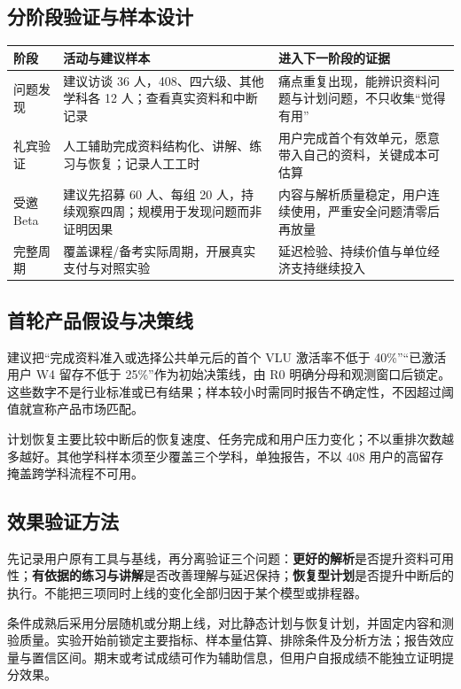 \documentclass[UTF8,a4paper,11pt,fontset=none]{ctexart}
\newcommand{\cth}[1]{\textbf{\sffamily #1}}
\newenvironment{tbl}{\par\vspace{3pt}\small\noindent\ignorespaces}{\unskip\par\vspace{5pt}}
\begin{document}
\subsection{分阶段验证与样本设计}
\begin{tbl}
\begin{tabularx}{\linewidth}{@{}L{25mm}YY@{}}
\toprule
\cth{阶段}&\cth{活动与建议样本}&\cth{进入下一阶段的证据}\\\midrule
问题发现&建议访谈 36 人，408、四六级、其他学科各 12 人；查看真实资料和中断记录&痛点重复出现，能辨识资料问题与计划问题，不只收集“觉得有用”\\
礼宾验证&人工辅助完成资料结构化、讲解、练习与恢复；记录人工工时&用户完成首个有效单元，愿意带入自己的资料，关键成本可估算\\
受邀 Beta&建议先招募 60 人、每组 20 人，持续观察四周；规模用于发现问题而非证明因果&内容与解析质量稳定，用户连续使用，严重安全问题清零后再放量\\
完整周期&覆盖课程/备考实际周期，开展真实支付与对照实验&延迟检验、持续价值与单位经济支持继续投入\\
\bottomrule
\end{tabularx}
\end{tbl}

\subsection{首轮产品假设与决策线}
建议把“完成资料准入或选择公共单元后的首个 VLU 激活率不低于 40\%”“已激活用户 W4 留存不低于 25\%”作为初始决策线，由 R0 明确分母和观测窗口后锁定。这些数字不是行业标准或已有结果；样本较小时需同时报告不确定性，不因超过阈值就宣称产品市场匹配。

计划恢复主要比较中断后的恢复速度、任务完成和用户压力变化；不以重排次数越多越好。其他学科样本须至少覆盖三个学科，单独报告，不以 408 用户的高留存掩盖跨学科流程不可用。

\subsection{效果验证方法}
先记录用户原有工具与基线，再分离验证三个问题：\textbf{更好的解析}是否提升资料可用性；\textbf{有依据的练习与讲解}是否改善理解与延迟保持；\textbf{恢复型计划}是否提升中断后的执行。不能把三项同时上线的变化全部归因于某个模型或排程器。

条件成熟后采用分层随机或分期上线，对比静态计划与恢复计划，并固定内容和测验质量。实验开始前锁定主要指标、样本量估算、排除条件及分析方法；报告效应量与置信区间。期末或考试成绩可作为辅助信息，但用户自报成绩不能独立证明提分效果。
\end{document}
